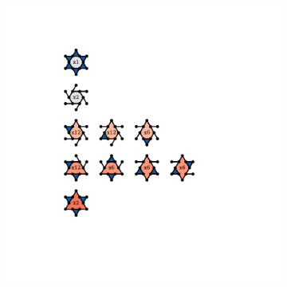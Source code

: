 \begin{figure}[bt]
\begin{subfigure}[b]{0.1\textwidth}
         \caption{}
         \label{fig:pro3pktrihex4}
     \end{subfigure}
     \hfill
     \begin{subfigure}[b]{0.1\textwidth}
         \centering
         \includegraphics[width=\textwidth]{./figures/procrystals/kagome7c.pdf}
         \caption{}
         \label{fig:pro3pktrihex5}
     \end{subfigure}
     \hfill
     

\end{figure}
